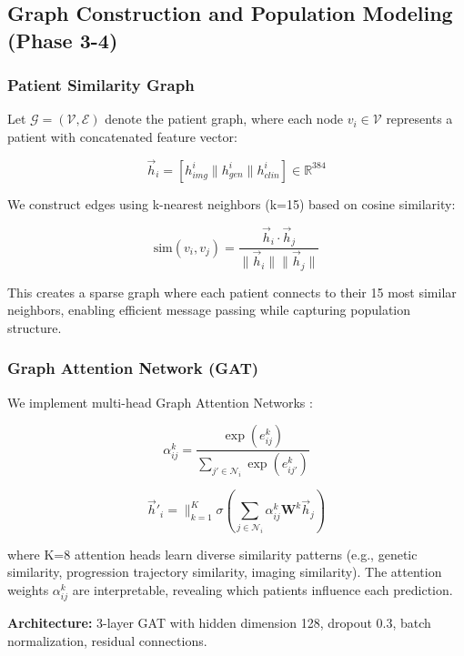 \documentclass[conference]{IEEEtran}
\begin{document}
\subsection{Graph Construction and Population Modeling (Phase 3-4)}

\subsubsection{Patient Similarity Graph}
Let $\mathcal{G} = (\mathcal{V}, \mathcal{E})$ denote the patient graph, where each node $v_i \in \mathcal{V}$ represents a patient with concatenated feature vector:

\begin{equation}
\vec{h}_i = [h_{img}^i \| h_{gen}^i \| h_{clin}^i] \in \mathbb{R}^{384}
\end{equation}

We construct edges using k-nearest neighbors (k=15) based on cosine similarity:

\begin{equation}
\text{sim}(v_i, v_j) = \frac{\vec{h}_i \cdot \vec{h}_j}{\|\vec{h}_i\| \|\vec{h}_j\|}
\end{equation}

This creates a sparse graph where each patient connects to their 15 most similar neighbors, enabling efficient message passing while capturing population structure.

\subsubsection{Graph Attention Network (GAT)}
We implement multi-head Graph Attention Networks \cite{velickovic2018graph}:

\begin{equation}
\alpha_{ij}^k = \frac{\exp(e_{ij}^k)}{\sum_{j' \in \mathcal{N}_i} \exp(e_{ij'}^k)}
\end{equation}

\begin{equation}
\vec{h}'_i = \|_{k=1}^K \sigma\left(\sum_{j \in \mathcal{N}_i} \alpha_{ij}^k \mathbf{W}^k\vec{h}_j\right)
\end{equation}

where K=8 attention heads learn diverse similarity patterns (e.g., genetic similarity, progression trajectory similarity, imaging similarity). The attention weights $\alpha_{ij}^k$ are interpretable, revealing which patients influence each prediction.

\textbf{Architecture:} 3-layer GAT with hidden dimension 128, dropout 0.3, batch normalization, residual connections.
\end{document}
